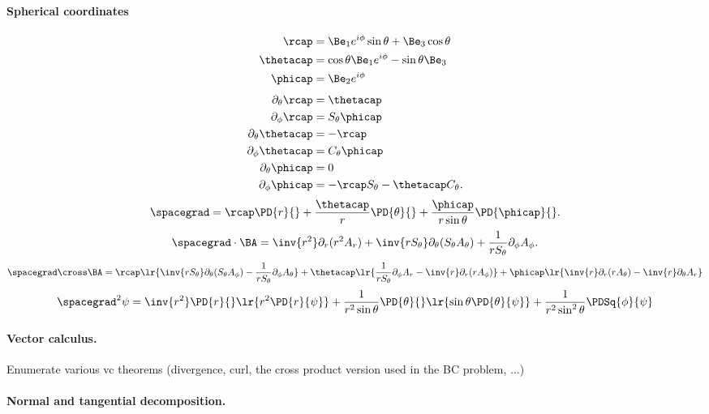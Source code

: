 \paragraph{Spherical coordinates}
%
\begin{equation}\label{eqn:usefulFormulas:840}
\begin{aligned}
\rcap &= \Be_1 e^{i\phi} \sin\theta + \Be_3 \cos\theta \\
\thetacap &= \cos\theta \Be_1 e^{i\phi} - \sin\theta \Be_3 \\
\phicap &= \Be_2 e^{i\phi}
\end{aligned}
\end{equation}
%
\begin{equation}\label{eqn:usefulFormulas:860}
\begin{aligned}
\partial_{\theta}{\rcap}      &= \thetacap \\
\partial_{\phi}{\rcap}        &= S_\theta \phicap \\
\partial_{\theta}{\thetacap}  &= -\rcap \\
\partial_{\phi}{\thetacap}    &= C_\theta \phicap \\
\partial_{\theta}{\phicap}    &= 0 \\
\partial_{\phi}{\phicap}      &= -\rcap S_\theta - \thetacap C_\theta.
\end{aligned}
\end{equation}
%
\begin{dmath}\label{eqn:usefulFormulas:880}
\spacegrad
=
\rcap \PD{r}{} +
\frac{\thetacap}{r} \PD{\theta}{} +
\frac{\phicap}{r\sin\theta} \PD{\phicap}{}.
\end{dmath}
%
\begin{dmath}\label{eqn:usefulFormulas:900}
\spacegrad \cdot \BA
=
\inv{r^2} \partial_r (r^2 A_r)
+ \inv{r S_\theta} \partial_\theta (S_\theta A_\theta)
+ \frac{1}{r S_\theta} \partial_\phi A_\phi.
\end{dmath}
%
\begin{dmath}\label{eqn:usefulFormulas:920}
\spacegrad \cross \BA
=
   \rcap \lr{
       \inv{r S_\theta} \partial_\theta (S_\theta A_\phi)
      -\frac{1}{r S_\theta} \partial_\phi A_\theta
   }
   + \thetacap \lr{
      \frac{1}{r S_\theta} \partial_\phi A_r
      -\inv{r} \partial_r (r A_\phi)
   }
   + \phicap \lr{
        \inv{r} \partial_r (r A_\theta)
      - \inv{r} \partial_\theta A_r
   }
\end{dmath}
%
\begin{dmath}\label{eqn:usefulFormulas:940}
\spacegrad^2 \psi
=
    \inv{r^2} \PD{r}{} \lr{ r^2 \PD{r}{ \psi} }
   + \frac{1}{r^2 \sin\theta} \PD{\theta}{} \lr{ \sin\theta \PD{\theta}{ \psi } }
   + \frac{1}{r^2 \sin^2\theta} \PDSq{\phi}{ \psi}
\end{dmath}
%
\paragraph{Vector calculus.}
%
Enumerate various vc theorems (divergence, curl, the cross product version used in the BC problem, ...)
%
\paragraph{Normal and tangential decomposition.}
%

